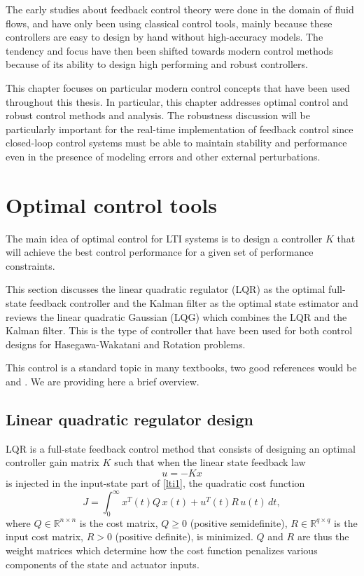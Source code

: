 \documentclass[12pt,lot, lof]{puthesis}
\begin{document}
The early studies about feedback control theory were done in the domain of fluid flows, and have only been using classical control tools, mainly because these controllers are easy to design by hand without high-accuracy models. The tendency and focus have then been shifted towards modern control methods because of its ability to design high performing and robust controllers.

This chapter focuses on particular modern control concepts that have been used throughout this thesis. In particular, this chapter addresses optimal control and robust control methods and analysis. The robustness discussion will be particularly important for the real-time implementation of feedback control since closed-loop control systems must be able to maintain stability and performance even in the presence of modeling errors and other external perturbations.
 

\section{Optimal control tools}

The main idea of optimal control for LTI systems is to design a controller $K$ that will achieve the best control performance for a given set of performance constraints.

This section discusses the linear quadratic regulator (LQR) as the optimal full-state feedback controller and the Kalman filter as the optimal state estimator and reviews the linear quadratic Gaussian (LQG) which combines the LQR and the Kalman filter. This is the type of controller that have been used for both control designs for Hasegawa-Wakatani and Rotation problems.

This control is a standard topic in many textbooks, two good references would be \cite{SandP} and \cite{AandM}. We are providing here a brief overview.

\subsection{ Linear quadratic regulator design}

LQR is a full-state feedback control method that consists of designing an optimal controller gain matrix $K$ such that when the linear state feedback law
\begin{equation}
\label{ltilqr}
u=-K x
\end{equation}
is injected in the input-state part of \eqref{lti1}, the quadratic cost function
\begin{equation}
J = \int_0^{\infty} x^T(t) Q \, x(t) + u^T(t) R \, u(t) \, dt,
\end{equation}
where $Q \in \mathbb{R}^{n \times n}$ is the cost matrix, $Q \ge 0$ (positive semidefinite), $R \in \mathbb{R}^{q \times q}$ is the input cost matrix, $R > 0$ (positive definite), is minimized.
$Q$ and $R$ are thus the weight matrices which determine how the cost function penalizes various components of the state and actuator inputs.
\end{document}
